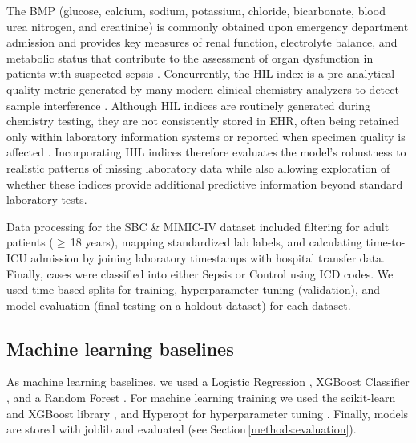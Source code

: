 \documentclass[pdflatex,sn-mathphys-num,lineno]{sn-jnl}
\theoremstyle{thmstyleone}%
\theoremstyle{thmstyletwo}%
\theoremstyle{thmstylethree}%
\begin{document}
The BMP (glucose, calcium, sodium, potassium, chloride, bicarbonate, blood urea nitrogen, and creatinine) is commonly obtained upon emergency department admission and provides key measures of renal function, electrolyte balance, and metabolic status that contribute to the assessment of organ dysfunction in patients with suspected sepsis \cite{Evans2021}. Concurrently, the HIL index is a pre-analytical quality metric generated by many modern clinical chemistry analyzers to detect sample interference \cite{Tian2022}. Although HIL indices are routinely generated during chemistry testing, they are not consistently stored in EHR, often being retained only within laboratory information systems or reported when specimen quality is affected \cite{Tian2022}. Incorporating HIL indices therefore evaluates the model's robustness to realistic patterns of missing laboratory data while also allowing exploration of whether these indices provide additional predictive information beyond standard laboratory tests.

Data processing for the SBC \& MIMIC-IV dataset included filtering for adult patients ($\geq$\,18 years), mapping standardized lab labels, and calculating time-to-ICU admission by joining laboratory timestamps with hospital transfer data. Finally, cases were classified into either Sepsis or Control using ICD codes. We used time-based splits for training, hyperparameter tuning (validation), and model evaluation (final testing on a holdout dataset) for each dataset. 

\subsection{Machine learning baselines}\label{methods:baseline}
As machine learning baselines, we used a Logistic Regression \cite{wright1995logistic}, XGBoost Classifier \cite{Chen2016}, and a Random Forest \cite{Breiman2001}. For machine learning training we used the scikit-learn \cite{scikit-learn} and XGBoost library \cite{xgboost}, and Hyperopt for hyperparameter tuning \cite{Bergstra2013}. Finally, models are stored with joblib \cite{joblib} and evaluated (see Section\,\ref{methods:evaluation}).
\end{document}
